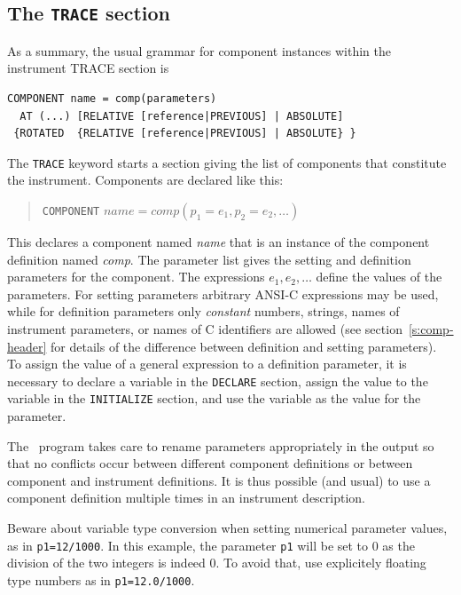 \subsection{The \texttt{TRACE} section}
\label{s:trace}


As a summary, the usual grammar for component instances within the instrument TRACE section is
\begin{verbatim}
COMPONENT name = comp(parameters)
  AT (...) [RELATIVE [reference|PREVIOUS] | ABSOLUTE]
 {ROTATED  {RELATIVE [reference|PREVIOUS] | ABSOLUTE} }
\end{verbatim}

The \texttt{TRACE} keyword starts a section giving the list of
components that constitute the instrument.
Components are declared like this:
\begin{quote}
  \texttt{COMPONENT} $\textit{name} =
    \textit{comp}(p_1 = e_1, p_2 = e_2, \ldots)$
\end{quote}
 
This declares a component named \textit{name} that is an instance of the
component definition named \textit{comp}. The parameter list gives the
setting and definition parameters for the component. The expressions $e_1,
e_2, \ldots$ define the values of the parameters. For setting parameters
arbitrary ANSI-C expressions may be used, while for definition parameters
only \emph{constant} numbers, strings, names of instrument parameters, or names
of C identifiers are allowed (see section~\ref{s:comp-header} for details of
the difference between definition and setting parameters). To assign the
value of a general expression to a definition parameter, it is necessary to
declare a variable in the \texttt{DECLARE} section, assign the value to the
variable in the \texttt{INITIALIZE} section, and use the variable as the
value for the parameter.

The \MCS\ program takes care to rename parameters appropriately in the
output so that no conflicts occur between different component
definitions or between component and instrument definitions. It is thus
possible (and usual) to use a component definition multiple times
in an instrument description.

Beware about variable type conversion when setting numerical parameter values, as in \verb+p1=12/1000+. In this example, the parameter \verb+p1+ will be set to 0 as the division of the two integers is indeed 0. To avoid that, use explicitely floating type numbers as in \verb+p1=12.0/1000+.

